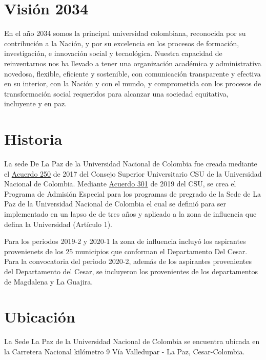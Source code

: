 \documentclass[
]{book}
\begin{document}
\hypertarget{vision}{%
\section*{Visión 2034}\label{vision}}

En el año 2034 somos la principal universidad colombiana, reconocida por su contribución a la Nación, y por su excelencia en los procesos de formación, investigación, e innovación social y tecnológica. Nuestra capacidad de reinventarnos nos ha llevado a tener una organización académica y administrativa novedosa, flexible, eficiente y sostenible, con comunicación transparente y efectiva en su interior, con la Nación y con el mundo, y comprometida con los procesos de transformación social requeridos para alcanzar una sociedad equitativa, incluyente y en paz.

\hypertarget{hist}{%
\section*{Historia}\label{hist}}

La sede De La Paz de la Universidad Nacional de Colombia fue creada mediante el \href{http://www.legal.unal.edu.co/rlunal/home/doc.jsp?d_i=89757}{Acuerdo 250} de 2017 del Consejo Superior Universitario CSU de la Universidad Nacional de Colombia. Mediante \href{http://www.legal.unal.edu.co/rlunal/home/doc.jsp?d_i=93599}{Acuerdo 301} de 2019 del CSU, se crea el Programa de Admisión Especial para los programas de pregrado de la Sede de La Paz de la Universidad Nacional de Colombia el cual se definió para ser implementado en un lapso de de tres años y aplicado a la zona de influencia que defina la Universidad (Artículo 1).

Para los periodos 2019-2 y 2020-1 la zona de influencia incluyó los aspirantes provenienets de los 25 municipios que conforman el Departamento Del Cesar. Para la convocatoria del periodo 2020-2, además de los aspirantes provenientes del Departamento del Cesar, se incluyeron los provenientes de los departamentos de Magdalena y La Guajira.

\hypertarget{ubica}{%
\section*{Ubicación}\label{ubica}}

La Sede La Paz de la Universidad Nacional de Colombia se encuentra ubicada en la Carretera Nacional kilómetro 9 Vía Valledupar - La Paz, Cesar-Colombia.
\end{document}
